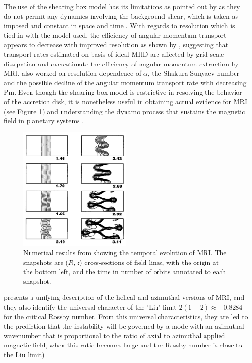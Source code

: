\documentclass{jfm}
\begin{document}
The use of the shearing box model has its limitations as pointed out by
\cite{Hawley1995} \cite{Regev2008} as they do not permit any dynamics involving
the background shear, which is taken as imposed and constant in space and time
\citep{Regev2008}. With regards to resolution which is tied in with the model
used, the efficiency of angular momentum transport appears to decrease with
improved resolution as shown by \cite{Fromang2007}, suggesting that transport
rates estimated on basis of ideal MHD are affected by grid-scale dissipation
and overestimate the efficiency of angular momentum extraction by MRI.
\cite{Kapyla2011} also worked on resolution dependence of $\alpha$, the
Shakura-Sunyaev number and the possible decline of the angular momentum
transport rate with decreasing Pm. Even though the shearing box model is
restrictive in resolving the behavior of the accretion disk, it is nonetheless
useful in obtaining actual evidence for MRI \cite{Balbus1998} (see Figure
\ref{fig:Balbus1998}) and understanding the dynamo process that sustains the
magnetic field in planetary systems \cite{Lesur2008}.


\begin{figure}
    \centering
    \includegraphics[width=0.50\textwidth]{Balbus1998}
    \caption{Numerical results from \cite{Balbus1998} showing the temporal evolution of MRI. The snapshots are ($R, z$) cross-sections of field lines, with the origin at the bottom left, and the time in number of orbits annotated to each snapshot.}
    \label{fig:Balbus1998}
\end{figure}


\cite{Kirillov2012} presents a unifying description of the helical and
azimuthal versions of MRI, and they also identify the universal character of
the 'Liu' limit $2(1 - 2) \approx - 0.8284$ for the critical Rossby number.
From this universal characteristics, they are led to the prediction that the
instability will be governed by a mode with an azimuthal wavenumber that is
proportional to the ratio of axial to azimuthal applied magnetic field, when
this ratio becomes large and the Rossby number is close to the Liu limit)
\end{document}

